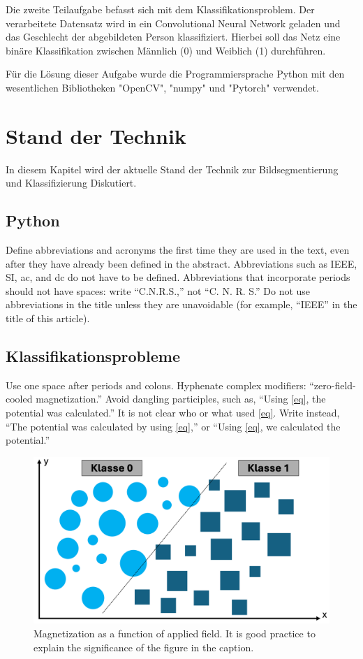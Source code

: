 \documentclass[journal,twoside,web]{ieeecolor}
\begin{document}
Die zweite Teilaufgabe befasst sich mit dem Klassifikationsproblem. 
Der verarbeitete Datensatz wird in ein Convolutional Neural Network geladen und das Geschlecht der abgebildeten Person klassifiziert. 
Hierbei soll das Netz eine binäre Klassifikation zwischen Männlich (0) und Weiblich (1) durchführen.

Für die Lösung dieser Aufgabe wurde die Programmiersprache Python mit den wesentlichen Bibliotheken "OpenCV", "numpy" und "Pytorch" verwendet. 

\section{Stand der Technik}
In diesem Kapitel wird der aktuelle Stand der Technik zur Bildsegmentierung und Klassifizierung Diskutiert.

\subsection{Python}
Define abbreviations and acronyms the first time they are used in the text, 
even after they have already been defined in the abstract. Abbreviations 
such as IEEE, SI, ac, and dc do not have to be defined. Abbreviations that 
incorporate periods should not have spaces: write ``C.N.R.S.,'' not ``C. N. 
R. S.'' Do not use abbreviations in the title unless they are unavoidable 
(for example, ``IEEE'' in the title of this article).

\subsection{Klassifikationsprobleme}
Use one space after periods and colons. Hyphenate complex modifiers: 
``zero-field-cooled magnetization.'' Avoid dangling participles, such as, 
``Using \eqref{eq}, the potential was calculated.'' It is not clear who or what 
used \eqref{eq}. Write instead, ``The potential was calculated by using \eqref{eq},'' or 
``Using \eqref{eq}, we calculated the potential.''

\begin{figure}[!t]
    \centerline{\includegraphics[width=\columnwidth]{Andi/binaere_klassifikation.png}}
    \caption{Magnetization as a function of applied field.
    It is good practice to explain the significance of the figure in the caption.}
    \label{fig:fig1}
\end{figure}
\end{document}
